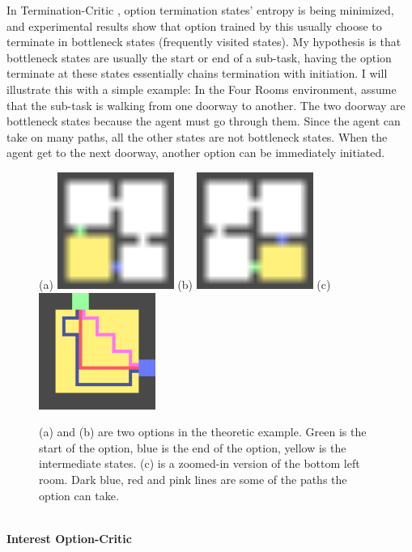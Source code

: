 \documentclass{article}
\begin{document}
	\normalsize{\quad In Termination-Critic \cite{harutyunyan2019termination}, option termination states' entropy is being minimized, and experimental results show that option trained by this usually choose to terminate in bottleneck states (frequently visited states). My hypothesis is that bottleneck states are usually the start or end of a sub-task, having the option terminate at these states essentially chains termination with initiation. I will illustrate this with a simple example: In the Four Rooms environment, assume that the sub-task is walking from one doorway to another. The two doorway are bottleneck states because the agent must go through them. Since the agent can take on many paths, all the other states are not bottleneck states. When the agent get to the next doorway, another option can be immediately initiated.}
	\begin{figure}[h]
		\centering
		\large{(a)}
		\includegraphics[width=1.5in]{termCrit1.png}
		\hspace{0.2in}
		\large{(b)}
		\includegraphics[width=1.5in]{termCrit2.png}
		\hspace{0.2in}
		\large{(c)}
		\includegraphics[width=1.5in]{termCrit3.png}
		\caption{(a) and (b) are two options in the theoretic example. Green is the start of the option, blue is the end of the option, yellow is the intermediate states. (c) is a zoomed-in version of the bottom left room. Dark blue, red and pink lines are some of the paths the option can take.}
	\end{figure}\vspace{0.15in}\\
	\large{\bfseries{Interest Option-Critic}}\vspace{0.05in}
\end{document}
